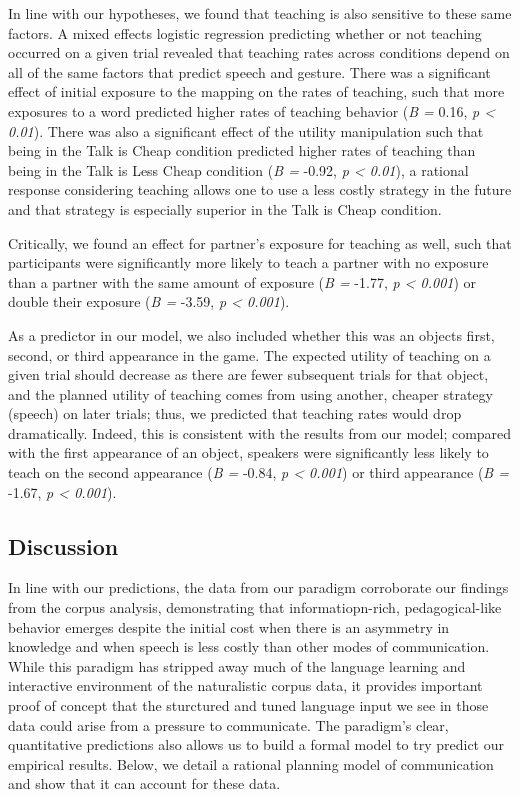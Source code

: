 \documentclass[10pt, letterpaper]{article}
\begin{document}
In line with our hypotheses, we found that teaching is also sensitive to
these same factors. A mixed effects logistic regression predicting
whether or not teaching occurred on a given trial revealed that teaching
rates across conditions depend on all of the same factors that predict
speech and gesture. There was a significant effect of initial exposure
to the mapping on the rates of teaching, such that more exposures to a
word predicted higher rates of teaching behavior (\emph{B =} 0.16,
\emph{p \textless{} 0.01}). There was also a significant effect of the
utility manipulation such that being in the Talk is Cheap condition
predicted higher rates of teaching than being in the Talk is Less Cheap
condition (\emph{B =} -0.92, \emph{p \textless{} 0.01}), a rational
response considering teaching allows one to use a less costly strategy
in the future and that strategy is especially superior in the Talk is
Cheap condition.

Critically, we found an effect for partner's exposure for teaching as
well, such that participants were significantly more likely to teach a
partner with no exposure than a partner with the same amount of exposure
(\emph{B =} -1.77, \emph{p \textless{} 0.001}) or double their exposure
(\emph{B =} -3.59, \emph{p \textless{} 0.001}).

As a predictor in our model, we also included whether this was an
objects first, second, or third appearance in the game. The expected
utility of teaching on a given trial should decrease as there are fewer
subsequent trials for that object, and the planned utility of teaching
comes from using another, cheaper strategy (speech) on later trials;
thus, we predicted that teaching rates would drop dramatically. Indeed,
this is consistent with the results from our model; compared with the
first appearance of an object, speakers were significantly less likely
to teach on the second appearance (\emph{B =} -0.84, \emph{p \textless{}
0.001}) or third appearance (\emph{B =} -1.67, \emph{p \textless{}
0.001}).

\subsection{Discussion}\label{discussion-1}

In line with our predictions, the data from our paradigm corroborate our
findings from the corpus analysis, demonstrating that informatiopn-rich,
pedagogical-like behavior emerges despite the initial cost when there is
an asymmetry in knowledge and when speech is less costly than other
modes of communication. While this paradigm has stripped away much of
the language learning and interactive environment of the naturalistic
corpus data, it provides important proof of concept that the sturctured
and tuned language input we see in those data could arise from a
pressure to communicate. The paradigm's clear, quantitative predictions
also allows us to build a formal model to try predict our empirical
results. Below, we detail a rational planning model of communication and
show that it can account for these data.
\end{document}
